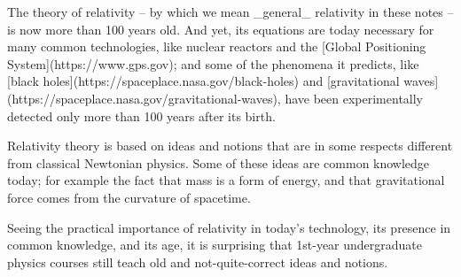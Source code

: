 















The theory of relativity -- by which we mean _general_ relativity in these notes -- is now more than 100 years old. And yet, its equations are today necessary for many common technologies, like nuclear reactors and the [Global Positioning System](https://www.gps.gov); and some of the phenomena it predicts, like [black holes](https://spaceplace.nasa.gov/black-holes) and [gravitational waves](https://spaceplace.nasa.gov/gravitational-waves), have been experimentally detected only more than 100 years after its birth.

Relativity theory is based on ideas and notions that are in some respects different from classical Newtonian physics. Some of these ideas are common knowledge today; for example the fact that mass is a form of energy, and that gravitational force comes from the curvature of spacetime.

Seeing the practical importance of relativity in today's technology, its presence in common knowledge, and its age, it is surprising that 1st-year undergraduate physics courses still teach old and not-quite-correct ideas and notions.

